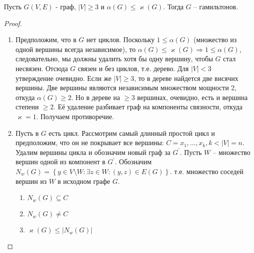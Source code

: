 \begin{theorem}
	Пусть $G(V, E)$ - граф, $ |V| \geqslant 3 $ и $\alpha(G) \leqslant \varkappa(G)$. Тогда $G$ -- гамильтонов.
\end{theorem}

\begin{proof}
	\:
	\begin{enumerate} \renewcommand{\theenumi}{\bfseries\arabic{enumi}}
		\item Предположим, что в $ G $ нет циклов. Поскольку $1 \leqslant \alpha(G)$ (множество из одной вершины всегда независимое), то $ \alpha(G) \leqslant \varkappa(G) \Rightarrow 1 \leqslant \alpha(G)$, следовательно, мы должны удалить хотя бы одну вершину, чтобы $ G $ стал несвязен. Отсюда $ G $ связен и без циклов, т.е. дерево. Для $ |V| < 3$ утверждение очевидно. Если же $ |V| \geqslant 3$, то в дереве найдется две висячих вершины. Две вершины являются независимым множеством мощности 2, откуда $ \alpha(G) \geqslant 2$. Но в дереве на $ \geqslant 3$ вершинах, очевидно, есть и вершина степени $ \geqslant 2$. Её удаление разбивает граф на компоненты связности, откуда $ \varkappa = 1$. Получаем противоречие.
		
		\item Пусть в $ G $ есть цикл. Рассмотрим самый длинный простой цикл и предположим, что он не покрывает все вершины: $ C = {x_1, \ldots, x_k}, k < |V| = n $. Удалим вершины цикла и обозначим новый граф за $ G^\prime $. Пусть $ W $ -- множество вершин одной из компонент в $ G^\prime $. Обозначим $ N_{w}\left(G \right) = \left\lbrace y \in V\setminus W : \exists z \in W : (y, z) \in E(G)\right\rbrace$. т.\:е. множество соседей вершин из $ W $ в исходном графе $ G $.
		
				
	
		\begin{prop}
			\:
			\begin{enumerate} \renewcommand{\theenumi}{\arabic{enumi}}
				\item $ N_{w}\left(G \right) \subseteq C$
				\item $ N_{w}\left(G \right) \neq C$
				\item $ \varkappa(G) \leqslant |N_w(G)| $
			\end{enumerate} \label{prop:N_w}
			

\end{prop}
\end{enumerate}
\end{proof}
